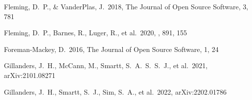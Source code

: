 \documentclass[twocolumn, twocolappendix]{aastex63}
\begin{document}
\begin{thebibliography}{}






 Fleming, D.~P., \& VanderPlas, J.\ 2018, The Journal of Open Source Software, 3, 781


 Fleming, D.~P., Barnes, R., Luger, R., et al.\ 2020, \apj, 891, 155






 Foreman-Mackey, D.\ 2016, The Journal of Open Source Software, 1, 24







 




 Gillanders, J.~H., McCann, M., Smartt, S.~A.~S.~S.~J., et al.\ 2021, arXiv:2101.08271


 Gillanders, J.~H., Smartt, S.~J., Sim, S.~A., et al.\ 2022, arXiv:2202.01786



\end{thebibliography}
\end{document}
